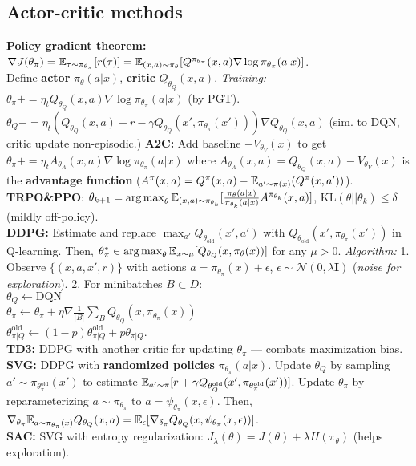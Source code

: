 \subsection{Actor-critic methods}
\textbf{Policy gradient theorem:} 
$\nabla J(\theta_\pi) = \mathbb{E}_{\tau\sim\pi_{\theta_\pi}}[r(\tau)] = \mathbb{E}_{(x,a)\sim\pi_\theta}[Q^{\pi_{\theta_\pi}}(x,a)\nabla\log\pi_{\theta_\pi}(a|x)]$.\\
Define \textbf{actor} $\pi_\theta(a|x)$, \textbf{critic} $Q_{\theta_Q}(x,a)$. \emph{Training:} $\theta_\pi \mathrel{{+}{=}} \eta_t Q_{\theta_Q}(x,a)\nabla\log\pi_{\theta_\pi}(a|x)$ (by PGT).\\
$\theta_Q \mathrel{{-}{=}} \eta_t(Q_{\theta_Q}(x,a)-r-\gamma Q_{\theta_Q}(x',\pi_{\theta_\pi}(x')))\nabla Q_{\theta_Q}(x,a)$
(sim. to DQN, critic update non-episodic.)
\textbf{A2C:} Add baseline $-V_{\theta_V}(x)$ to get
$\theta_\pi \mathrel{{+}{=}} \eta_t A_{\theta_A}(x,a)\nabla\log\pi_{\theta_\pi}(a|x)$ where $A_{\theta_A}(x,a) = Q_{\theta_Q}(x,a) - V_{\theta_V}(x)$ is the \textbf{advantage function} ($A^\pi(x,a) = Q^{\pi}(x,a)-\mathbb{E}_{a'\sim\pi(x)}(Q^{\pi}(x,a'))$).\\
\textbf{TRPO\&PPO}: $\theta_{k+1} = \operatorname*{arg\,max}_\theta \mathbb{E}_{(x,a)\sim\pi_{\theta_k}}[\frac{\pi_\theta(a|x)}{\pi_{\theta_k}(a|x)}A^{\pi_{\theta_k}}(x,a)]$, $\mathrm{KL}(\theta||\theta_k)\leq\delta$ (mildly off-policy).\\
\textbf{DDPG:} Estimate and replace $\max_{a'}Q_{\theta_\mathrm{old}}(x',a')$ with $Q_{\theta_{\mathrm{old}}}(x', \pi_{\theta_\pi}(x'))$ in Q-learning. Then, $\theta^*_{\pi}\in\operatorname*{arg\,max}_\theta \mathbb{E}_{x\sim\mu}[Q_{\theta_Q}(x,\pi_\theta(x))]$ for any $\mu > 0$. \emph{Algorithm:} 1. Observe $\{(x,a,x',r)\}$ with actions $a=\pi_{\theta_\pi}(x)+\epsilon$, $\epsilon\sim\mathcal{N}(0,\lambda\mathbf{I})$ (\emph{noise for exploration}). 2. For minibatches $B\subset D$:\\
$\theta_Q \leftarrow \mathrm{DQN}$\\
$\theta_\pi \leftarrow \theta_\pi +\eta\nabla\frac{1}{|B|}\sum_B Q_{\theta_Q}(x,\pi_{\theta_\pi}(x))$\\
$\theta^{\mathrm{old}}_{\pi | Q} \leftarrow (1-p)\theta^{\mathrm{old}}_{\pi | Q} + p\theta_{\pi | Q}$.\\
\textbf{TD3:} DDPG with another critic for updating $\theta_\pi$ --- combats maximization bias.\\
\textbf{SVG:} DDPG with \textbf{randomized policies} $\pi_{\theta_\pi}(a|x)$. Update $\theta_Q$ by sampling $a'\sim\pi_{\theta^\mathrm{old}_\pi}(x')$ to estimate $\mathbb{E}_{a'\sim\pi}[r+\gamma Q_{\theta^\mathrm{old}_Q}(x',\pi_{\theta^\mathrm{old}_\pi}(x'))]$. Update $\theta_\pi$ by reparameterizing $a\sim\pi_{\theta_\pi}$ to $a=\psi_{\theta_\pi}(x,\epsilon)$.
Then, $\nabla_{\theta_\pi}\mathbb{E}_{a\sim\pi_{\theta_\pi}(x)}Q_{\theta_Q}(x,a) = \mathbb{E}_\epsilon[\nabla_{\delta_\pi}Q_{\theta_Q}(x,\psi_{\theta_\pi}(x,\epsilon))]$.\\
\textbf{SAC:} SVG with entropy regularization: $J_\lambda(\theta) = J(\theta) + \lambda H(\pi_\theta)$ (helps exploration).
